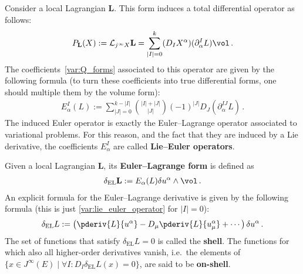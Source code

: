     \begin{example}
        Consider a local Lagrangian $\mathbf{L}$. This form induces a total differential operator as follows:
        \begin{gather}
            P_{\mathbf{L}}(X) := \mathcal{L}_{j^\infty X}\mathbf{L} = \sum_{|I|=0}^k(D_IX^\alpha)(\partial^I_\alpha L)\vol\,.
        \end{gather}
        The coefficients~\eqref{var:Q_forms} associated to this operator are given by the following formula (to turn these coefficients into true differential forms, one should multiple them by the volume form):
        \begin{gather}
            \label{var:lie_euler_operator}
            E^I_\alpha(L) := \sum_{|J|=0}^{k-|I|}\binom{|I|+|J|}{|J|}(-1)^{|J|}D_J\left(\partial^{IJ}_\alpha L\right)\,.
        \end{gather}
        The induced Euler operator is exactly the Euler--Lagrange operator associated to variational problems. For this reason, and the fact that they are induced by a Lie derivative, the coefficients $E^I_\alpha$ are called \textbf{Lie--Euler operators}.

        Given a local Lagrangian $\mathbf{L}$, its \textbf{Euler--Lagrange form} is defined as
        \begin{gather}
            \delta_{\text{EL}}\mathbf{L} := E_\alpha(L)\delta u^\alpha\wedge\vol\,.
        \end{gather}
        An explicit formula for the Euler--Lagrange derivative is given by the following formula (this is just \cref{var:lie_euler_operator} for $|I|=0$):
        \begin{gather}
            \label{var:euler_lagrange_derivative}
            \delta_{\text{EL}}L := \left(\pderiv{L}{u^\alpha} - D_\mu\pderiv{L}{u^\alpha_\mu} + \cdots\right)\delta u^\alpha\,.
        \end{gather}
        The set of functions that satisfy $\delta_{\text{EL}}L=0$ is called the \textbf{shell}. The functions for which also all higher-order derivatives vanish, i.e.~the elements of $\{x\in J^\infty(E)\mid\forall I:D_I\delta_{\text{EL}}L(x) = 0\}$, are said to be \textbf{on-shell}.
    \end{example}

